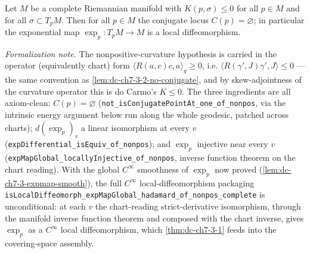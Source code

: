 \begin{lemma}
  \label{lem:dc-ch7-3-2}
  \leanok
  Let $M$ be a complete Riemannian manifold with $K(p,\sigma)\le 0$ for all $p\in M$
  and for all $\sigma\subset T_pM$. Then for all $p\in M$ the conjugate locus
  $C(p)=\varnothing$; in particular the exponential map $\exp_p:T_pM\to M$ is a local
  diffeomorphism.

  \emph{Formalization note.} The nonpositive-curvature hypothesis is carried in the operator
  (equivalently chart) form $\langle R(a,c)c,a\rangle_g\ge 0$, i.e.
  $\langle R(\gamma',J)\gamma',J\rangle\le 0$ — the same convention as
  \cref{lem:dc-ch7-3-2-no-conjugate}, and by skew-adjointness of the curvature operator this is
  do Carmo's $K\le 0$. The three ingredients are all axiom-clean: $C(p)=\varnothing$
  (\lstinline{not_isConjugatePointAt_one_of_nonpos}, via the intrinsic energy argument below run
  along the whole geodesic, patched across charts); $d(\exp_p)_v$ a linear isomorphism at every
  $v$ (\lstinline{expDifferential_isEquiv_of_nonpos}); and $\exp_p$ injective near every $v$
  (\lstinline{expMapGlobal_locallyInjective_of_nonpos}, inverse function theorem on the chart
  reading). With the global $C^\infty$ smoothness of $\exp_p$ now proved
  (\cref{lem:dc-ch7-3-expmap-smooth}), the full $C^\infty$ local-diffeomorphism packaging
  \lstinline{isLocalDiffeomorph_expMapGlobal_hadamard_of_nonpos_complete} is unconditional: at
  each $v$ the chart-reading strict-derivative isomorphism, through the manifold inverse function
  theorem and composed with the chart inverse, gives $\exp_p$ as a $C^\infty$ local
  diffeomorphism, which \cref{thm:dc-ch7-3-1} feeds into the covering-space assembly.
\end{lemma}
